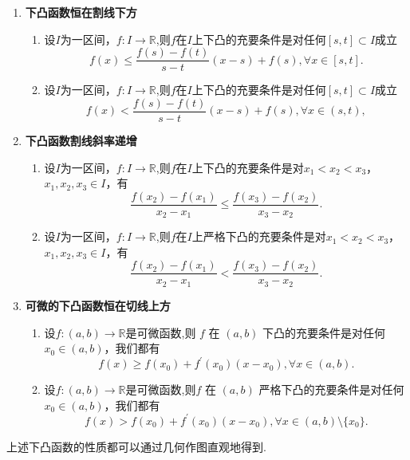 \documentclass[lang=cn,newtx,10pt,scheme=chinese]{elegantbook}
\begin{document}
\begin{proposition}[下凸函数的基本性质]\label{proposition:下凸函数的基本性质}
\begin{enumerate}
\item\label{下凸函数恒在割线下方} \textbf{下凸函数恒在割线下方}
\begin{enumerate}[(1)]
\item 设\(I\)为一区间，\(f:I\to\mathbb{R}\),则\(f\)在\(I\)上下凸的充要条件是对任何\([s,t]\subset I\)成立
\[
f(x)\leqslant\frac{f(s)-f(t)}{s - t}(x - s)+f(s),\forall x\in[s,t].
\]

\item 设\(I\)为一区间，\(f:I\to\mathbb{R}\),则\(f\)在\(I\)上下凸的充要条件是对任何\([s,t]\subset I\)成立
\[
f(x)<\frac{f(s)-f(t)}{s - t}(x - s)+f(s),\forall x\in(s,t),
\]
\end{enumerate}

\item\label{下凸函数割线斜率递增} \textbf{下凸函数割线斜率递增}
\begin{enumerate}[(1)]
\item 设\(I\)为一区间，\(f:I\to\mathbb{R}\),则\(f\)在\(I\)上下凸的充要条件是对\(x_1 < x_2 < x_3\)，\(x_1,x_2,x_3\in I\)，有
\[
\frac{f(x_2)-f(x_1)}{x_2 - x_1}\leqslant\frac{f(x_3)-f(x_2)}{x_3 - x_2}.
\]

\item 设\(I\)为一区间，\(f:I\to\mathbb{R}\),则\(f\)在\(I\)上严格下凸的充要条件是对\(x_1 < x_2 < x_3\)，\(x_1,x_2,x_3\in I\)，有
\[
\frac{f(x_2)-f(x_1)}{x_2 - x_1}<\frac{f(x_3)-f(x_2)}{x_3 - x_2}.
\]
\end{enumerate}

\item\label{可微的下凸函数恒在切线上方} \textbf{可微的下凸函数恒在切线上方}
\begin{enumerate}[(1)]
\item 设\(f:(a,b)\to\mathbb{R}\)是可微函数,则 \(f\) 在 \((a,b)\) 下凸的充要条件是对任何 \(x_{0}\in(a,b)\)，我们都有
\[
f(x)\geqslant f(x_{0})+f^{\prime}(x_{0})(x - x_{0}),\forall x\in(a,b).
\]

\item 设\(f:(a,b)\to\mathbb{R}\)是可微函数,则\(f\) 在 \((a,b)\) 严格下凸的充要条件是对任何 \(x_{0}\in(a,b)\)，我们都有
\[
f(x)> f(x_{0})+f^{\prime}(x_{0})(x - x_{0}),\forall x\in(a,b)\setminus\{x_{0}\}.
\]
\end{enumerate}
\end{enumerate}
\end{proposition}
\begin{remark}
   上述下凸函数的性质都可以通过几何作图直观地得到.
\end{remark}
\end{document}
